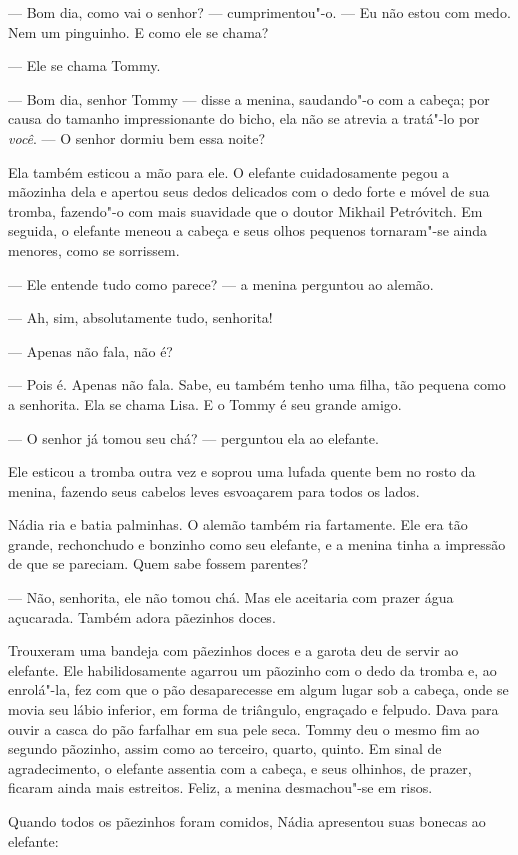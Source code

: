 --- Bom dia, como vai o senhor? --- cumprimentou"-o. --- Eu não estou com
medo. Nem um pinguinho. E como ele se chama?

--- Ele se chama Tommy.

--- Bom dia, senhor Tommy --- disse a menina, saudando"-o com a cabeça;
por causa do tamanho impressionante do bicho, ela não se atrevia a
tratá"-lo por \emph{você}. --- O senhor dormiu bem essa noite?

Ela também esticou a mão para ele. O elefante cuidadosamente pegou a
mãozinha dela e apertou seus dedos delicados com o dedo forte e móvel
de sua tromba, fazendo"-o com mais suavidade que o doutor Mikhail
Petróvitch. Em seguida, o elefante meneou a cabeça e seus olhos pequenos
tornaram"-se ainda menores, como se sorrissem.

--- Ele entende tudo como parece? --- a menina perguntou ao alemão.

--- Ah, sim, absolutamente tudo, senhorita!

--- Apenas não fala, não é?

--- Pois é. Apenas não fala. Sabe, eu também tenho uma filha, tão
pequena como a senhorita. Ela se chama Lisa. E o Tommy é seu grande
amigo.

--- O senhor já tomou seu chá? --- perguntou ela ao
elefante.

Ele esticou a tromba outra vez e soprou uma lufada quente bem no
rosto da menina, fazendo seus cabelos leves esvoaçarem para todos os
lados.

Nádia ria e batia palminhas. O alemão também ria fartamente. Ele era
tão grande, rechonchudo e bonzinho como seu elefante, e a menina tinha a
impressão de que se pareciam. Quem sabe fossem parentes?

--- Não, senhorita, ele não tomou chá. Mas ele aceitaria com prazer água
açucarada. Também adora pãezinhos doces.

Trouxeram uma bandeja com pãezinhos doces e a garota deu de servir ao
elefante. Ele habilidosamente agarrou um pãozinho com o dedo da tromba
e, ao enrolá"-la, fez com que o pão desaparecesse em algum lugar sob a
cabeça, onde se movia seu lábio inferior, em forma de triângulo, engraçado e felpudo. Dava para ouvir a casca do pão farfalhar em sua pele seca.
Tommy deu o mesmo fim ao segundo pãozinho, assim como ao terceiro,
quarto, quinto. Em sinal de agradecimento, o elefante assentia com a
cabeça, e seus olhinhos, de prazer, ficaram ainda mais estreitos.
Feliz, a menina desmachou"-se em risos.

Quando todos os pãezinhos foram comidos, Nádia apresentou suas bonecas
ao elefante:

